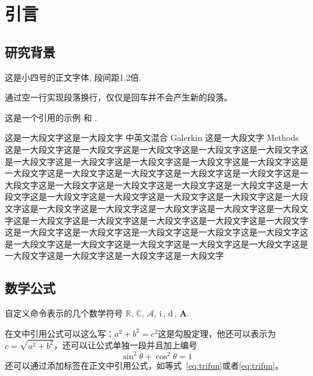 \documentclass{shnuthesis}
\newcommand{\CC}{\ensuremath{\mathbb{C}}}
\newcommand{\RR}{\ensuremath{\mathbb{R}}}
\newcommand{\A}{\mathcal{A}}
\newcommand{\ii}{\bm{\mathrm{i}}\,}  %
\newcommand{\md}{\mathrm{d}\,}
\newcommand{\bA}{\boldsymbol{A}}
\begin{document}
    \maketoc[pagenumtoc]


	\clearpage %


\chapter{引言}

\section{研究背景}
这是小四号的正文字体, 段间距1.2倍.
	
通过空一行实现段落换行，仅仅是回车并不会产生新的段落。

这是一个引用的示例 \cite{Adams1975}和 \cite{Shen1994,Tadmor2012}.

这是一大段文字这是一大段文字 中英文混合 Galerkin 这是一大段文字 Methods 这是一大段文字这是一大段文字这是一大段文字这是一大段文字这是一大段文字这是一大段文字这是一大段文字这是一大段文字这是一大段文字这是一大段文字这是一大段文字这是一大段文字这是一大段文字这是一大段文字这是一大段文字这是一大段文字这是一大段文字这是一大段文字这是一大段文字这是一大段文字这是一大段文字这是一大段文字这是一大段文字这是一大段文字这是一大段文字这是一大段文字这是一大段文字这是一大段文字这是一大段文字这是一大段文字这是一大段文字这是一大段文字这是一大段文字这是一大段文字这是一大段文字这是一大段文字这是一大段文字这是一大段文字这是一大段文字这是一大段文字这是一大段文字这是一大段文字这是一大段文字这是一大段文字这是一大段文字这是一大段文字这是一大段文字这是一大段文字这是一大段文字这是一大段文字


\section{数学公式}

自定义命令表示的几个数学符号 $\RR$, $\CC$, $\A$, $\ii$, $\md$, $\bA$.

在文中引用公式可以这么写：$a^2+b^2=c^2$这是勾股定理，他还可以表示为$c=\sqrt{a^2+b^2}$，还可以让公式单独一段并且加上编号
\begin{equation}\label{eq:trifun}
\sin^2{\theta}+\cos^2{\theta}=1
\end{equation}
还可以通过添加标签在正文中引用公式，如等式~\eqref{eq:trifun}或者\ref{eq:trifun}。
\end{document}
